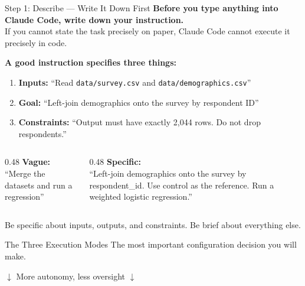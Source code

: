 \documentclass[aspectratio=169, 11pt]{beamer}
\begin{document}
\begin{frame}{Step 1: Describe --- Write It Down First}
  \textbf{Before you type anything into Claude Code, write down your instruction.}\\
  If you cannot state the task precisely on paper, Claude Code cannot execute it precisely in code.

  \vspace{0.5em}
  \textbf{A good instruction specifies three things:}
  \begin{enumerate}
    \item \textbf{Inputs:} ``Read \texttt{data/survey.csv} and \texttt{data/demographics.csv}''
    \item \textbf{Goal:} ``Left-join demographics onto the survey by respondent ID''
    \item \textbf{Constraints:} ``Output must have exactly 2,044 rows. Do not drop respondents.''
  \end{enumerate}

  \vspace{0.5em}
  \begin{columns}[T]
    \begin{column}{0.48\textwidth}
      \textbf{\color{red!70!black} Vague:}\\
      {\small ``Merge the datasets and run a regression''}
    \end{column}
    \begin{column}{0.48\textwidth}
      \textbf{\color{green!50!black} Specific:}\\
      {\small ``Left-join demographics onto the survey by respondent\_id. Use control as the reference. Run a weighted logistic regression.''}
    \end{column}
  \end{columns}

  \vspace{0.5em}
  \alert{Be specific about inputs, outputs, and constraints. Be brief about everything else.}
\end{frame}

\begin{frame}{The Three Execution Modes}
  \centering
  {\large The most important configuration decision you will make.}

  \vspace{1em}

  \vspace{0.5em}
  \small $\downarrow$ More autonomy, less oversight $\downarrow$
\end{frame}
\end{document}
